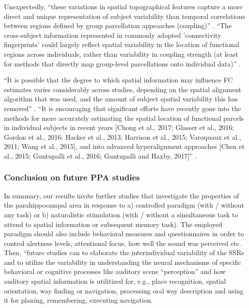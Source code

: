 %
Unexpectedly, ``these variations in spatial topographical features capture a
more direct and unique representation of subject variability than temporal
correlations between regions defined by group parcellation approaches
(coupling)'' \citep{bijsterbosch2018relationship}.
%
``The cross-subject information represented in commonly adopted 'connectivity
fingerprints' could largely reflect spatial variability in the location of
functional regions across individuals, rather than variability in coupling
strength (at least for methods that directly map group-level parcellations onto
individual data)'' \citep{bijsterbosch2018relationship}.

%
``It is possible that the degree to which spatial information may influence FC
estimates varies considerably across studies, depending on the spatial alignment
algorithm that was used, and the amount of subject spatial variability this has
removed'' \citep{bijsterbosch2018relationship}.
%
``It is encouraging that significant efforts have recently gone into the methods
for more accurately estimating the spatial location of functional parcels in
individual subjects in recent years [Chong et al., 2017; Glasser et al., 2016;
Gordon et al., 2016; Hacker et al., 2013; Harrison et al., 2015; Varoquaux et
al., 2011; Wang et al., 2015], and into advanced hyperalignment approaches [Chen
et al., 2015; Guntupalli et al., 2016; Guntupalli and Haxby, 2017]''
\citep{bijsterbosch2018relationship}.


\subsubsection{Conclusion on future PPA studies}


%
In summary, our results invite further studies that investigate the properties
of the parahippocampal area in response to a) controlled paradigm (with /
without any task) or b) naturalistic stimulation (with / without a simultaneous
task to attend to spatial information or subsequent memory task).
%
The employed paradigm should also include behavioral measures and questionnaires
in order to control alertness levels, attentional focus, how well the sound was
perceived etc.
%
Then, ``future studies can to elaborate the interindividual variability of the
SSRs and to utilize the variability in understanding the neural mechanisms of
specific behavioral or cognitive processes like auditory scene ``perception''
and how auditory spatial information is utilitized for, e.g., place recognition,
spatial orientation, way finding or navigation, processing oral way description
and using it for planing, remembering, executing navigation.


